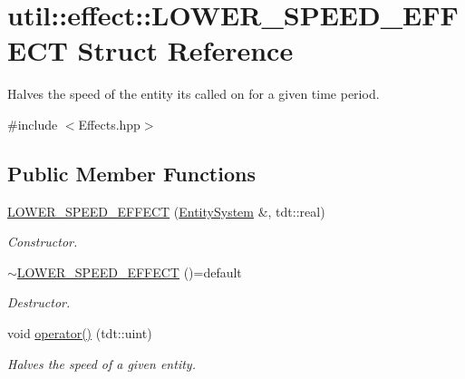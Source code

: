 \hypertarget{structutil_1_1effect_1_1_l_o_w_e_r___s_p_e_e_d___e_f_f_e_c_t}{}\section{util\+:\+:effect\+:\+:L\+O\+W\+E\+R\+\_\+\+S\+P\+E\+E\+D\+\_\+\+E\+F\+F\+E\+CT Struct Reference}
\label{structutil_1_1effect_1_1_l_o_w_e_r___s_p_e_e_d___e_f_f_e_c_t}


Halves the speed of the entity it\textquotesingle{}s called on for a given time period.  




{\ttfamily \#include $<$Effects.\+hpp$>$}

\subsection*{Public Member Functions}
\begin{DoxyCompactItemize}
\item 
\hyperlink{structutil_1_1effect_1_1_l_o_w_e_r___s_p_e_e_d___e_f_f_e_c_t_a229ec35de341edfbe481c91c1aa4b422}{L\+O\+W\+E\+R\+\_\+\+S\+P\+E\+E\+D\+\_\+\+E\+F\+F\+E\+CT} (\hyperlink{class_entity_system}{Entity\+System} \&, tdt\+::real)
\begin{DoxyCompactList}\small\item\em Constructor. \end{DoxyCompactList}\item 
\hyperlink{structutil_1_1effect_1_1_l_o_w_e_r___s_p_e_e_d___e_f_f_e_c_t_a3051d8bdb4e2cb3d5949fd3b7c543080}{$\sim$\+L\+O\+W\+E\+R\+\_\+\+S\+P\+E\+E\+D\+\_\+\+E\+F\+F\+E\+CT} ()=default
\begin{DoxyCompactList}\small\item\em Destructor. \end{DoxyCompactList}\item 
void \hyperlink{structutil_1_1effect_1_1_l_o_w_e_r___s_p_e_e_d___e_f_f_e_c_t_a895b93602a1f6cd53b1edc3438a0d25f}{operator()} (tdt\+::uint)
\begin{DoxyCompactList}\small\item\em Halves the speed of a given entity. \end{DoxyCompactList}\end{DoxyCompactItemize}
